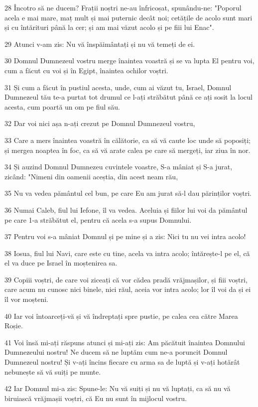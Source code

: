 \par 28 Încotro să ne ducem? Frații noștri ne-au înfricoșat, spunându-ne: "Poporul acela e mai mare, maț mult și mai puternic decât noi; cetățile de acolo sunt mari și cu întărituri până la cer; și am mai văzut acolo și pe fiii lui Enac".
\par 29 Atunci v-am zis: Nu vă înspăimântați și nu vă temeți de ei.
\par 30 Domnul Dumnezeul vostru merge înaintea voastră și se va lupta El pentru voi, cum a făcut cu voi și în Egipt, înaintea ochilor voștri.
\par 31 Și cum a făcut în pustiul acesta, unde, cum ai văzut tu, Israel, Domnul Dumnezeul tău te-a purtat tot drumul ce l-ați străbătut până ce ați sosit la locul acesta, cum poartă un om pe fiul său.
\par 32 Dar voi nici așa n-ați crezut pe Domnul Dumnezeul vostru,
\par 33 Care a mers înaintea voastră în călătorie, ca să vă caute loc unde să poposiți; și mergea noaptea în foc, ca să vă arate calea pe care să mergeți, iar ziua în nor.
\par 34 Și auzind Domnul Dumnezeu cuvintele voastre, S-a mâniat și S-a jurat, zicând: "Nimeni din oamenii aceștia, din acest neam rău,
\par 35 Nu va vedea pământul cel bun, pe care Eu am jurat să-l dau părinților voștri.
\par 36 Numai Caleb, fiul lui Iefone, îl va vedea. Aceluia și fiilor lui voi da pământul pe care 1-a străbătut el, pentru că acela s-a supus Domnului.
\par 37 Pentru voi s-a mâniat Domnul și pe mine și a zis: Nici tu nu vei intra acolo!
\par 38 Iosua, fiul lui Navi, care este cu tine, acela va intra acolo; întărește-l pe el, că el va duce pe Israel în moștenirea sa.
\par 39 Copiii voștri, de care voi ziceați că vor cădea pradă vrăjmașilor, și fiii voștri, care acum nu cunosc nici binele, nici răul, aceia vor intra acolo; lor îl voi da și ei îl vor moșteni.
\par 40 Iar voi întoarceți-vă și vă îndreptați spre pustie, pe calea cea către Marea Roșie.
\par 41 Voi însă mi-ați răspuns atunci și mi-ați zis: Am păcătuit înaintea Domnului Dumnezeului nostru! Ne ducem să ne luptăm cum ne-a poruncit Domnul Dumnezeul nostru! Și v-ați încins fiecare cu arma sa de luptă și v-ați hotărât nebunește să vă suiți pe munte.
\par 42 Iar Domnul mi-a zis: Spune-le: Nu vă suiți și nu vă luptați, ca să nu vă biruiască vrăjmașii voștri, că Eu nu sunt în mijlocul vostru.
